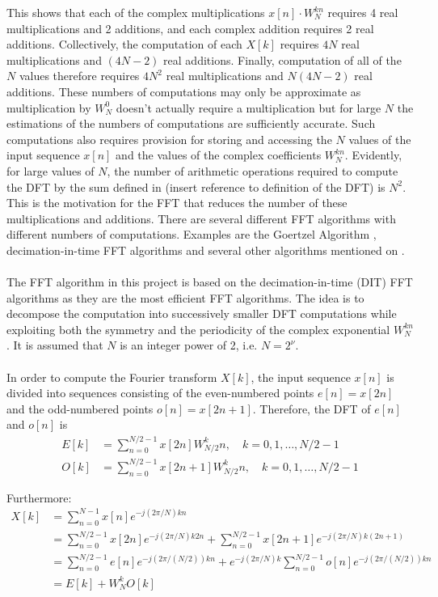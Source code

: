 This shows that each of the complex multiplications $x[n] \cdot W_N^{kn}$ requires 4 real multiplications and 2 additions, and each complex addition requires 2 real additions. Collectively, the computation of each $X[k]$ requires $4N$ real multiplications and $(4N-2)$ real additions. Finally, computation of all of the $N$ values therefore requires $4N^2$ real multiplications and $N(4N-2)$ real additions. These numbers of computations may only be approximate as multiplication by $W_N^0$ doesn't actually require a multiplication but for large $N$ the estimations of the numbers of computations are sufficiently accurate. Such computations also requires provision for storing and accessing the $N$ values of the input sequence $x[n]$ and the values of the complex coefficients $W_N^{kn}$. Evidently, for large values of $N$, the number of arithmetic operations required to compute the DFT by the sum defined in (insert reference to definition of the DFT) is $N^2$. This is the motivation for the FFT that reduces the number of these multiplications and additions. There are several different FFT algorithms with different numbers of computations. Examples are the Goertzel Algorithm \cite{page 751, DTSP}, decimation-in-time FFT algorithms \cite{page 755, DTSP} and several other algorithms mentioned on \cite{pages 306-307, FSP}.
\\ \\
The FFT algorithm in this project is based on the decimation-in-time (DIT) FFT algorithms as they are the most efficient FFT algorithms. The idea is to decompose the computation into successively smaller DFT computations while exploiting both the symmetry and the periodicity of the complex exponential $W_N^{kn}$ \cite{page 755, DTSP}. It is assumed that $N$ is an integer power of 2, i.e. $N = 2^\nu$.
\\ \\
In order to compute the Fourier transform $X[k]$, the input sequence $x[n]$ is divided into sequences consisting of the even-numbered points $e[n] = x[2n]$ and the odd-numbered points $o[n] = x[2n+1]$. Therefore, the DFT of $e[n]$ and $o[n]$ is
\begin{align*}
E[k] &= \sum_{n=0}^{N/2-1} x[2n] W_{N/2}^kn, \quad k = 0, 1, \dots, N/2-1 \\
O[k] &= \sum_{n=0}^{N/2-1} x[2n+1] W_{N/2}^kn, \quad k = 0, 1, \dots, N/2-1
\end{align*}

Furthermore:
\begin{align}
X[k] &= \sum_{n=0}^{N-1} x[n] e^{-j(2\pi/N)kn} \nonumber \\
&= \sum_{n=0}^{N/2-1} x[2n] e^{-j(2\pi/N)k2n} + \sum_{n=0}^{N/2-1} x[2n+1] e^{-j(2\pi/N)k(2n+1)} \nonumber \\
&= \sum_{n=0}^{N/2-1} e[n] e^{-j(2\pi/(N/2))kn} + e^{-j(2\pi/N)k} \sum_{n=0}^{N/2-1} o[n] e^{-j(2\pi/(N/2))kn} \nonumber \\
&= E[k] + W_N^k O[k] \label{FFT_DIT}
\end{align}

